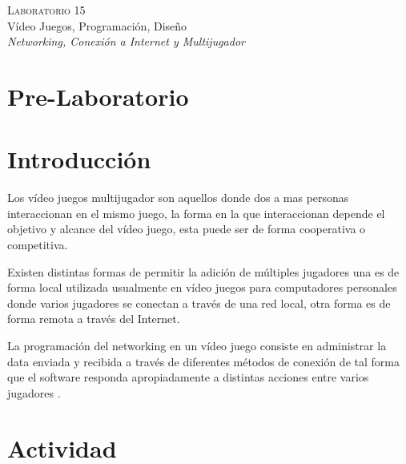 \begin{center}
\textsc{\Large Laboratorio 15}~\\
{\large Vídeo Juegos, Programación, Diseño}~\\
\emph{Networking, Conexión a Internet y Multijugador}
\end{center}

\section{Pre-Laboratorio}

\section{Introducción}
Los vídeo juegos multijugador son aquellos donde dos a mas personas interaccionan en el mismo juego, la forma en la que interaccionan depende el objetivo y alcance del vídeo juego, esta puede ser de forma cooperativa o competitiva.

Existen distintas formas de permitir la adición de múltiples jugadores una es de forma local utilizada usualmente en vídeo juegos para computadores personales donde varios jugadores se conectan a través de una red local, otra forma es de forma remota a través del Internet.

La programación del networking en un vídeo juego consiste en administrar la data enviada y recibida a través de diferentes métodos de conexión de tal forma que el software responda apropiadamente a distintas acciones entre varios jugadores \cite{valve_networking}.

\section{Actividad}
